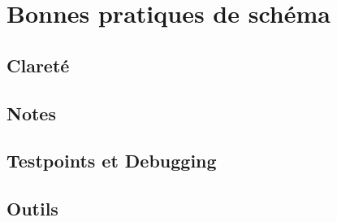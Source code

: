 
\section{Bonnes pratiques de schéma}

\subsection{Clareté}

\subsection{Notes}

\subsection{Testpoints et Debugging}

\subsection{Outils}

